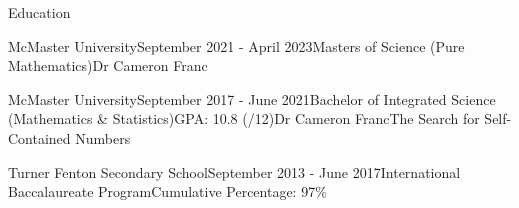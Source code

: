 \begin{rSection}{Education}

\begin{edSubsectionFull}{McMaster University}{September 2021 - April 2023}{Masters of Science (Pure Mathematics)}{}{Dr Cameron Franc}{}
\end{edSubsectionFull}

\begin{edSubsectionFull}{McMaster University}{September 2017 - June 2021}{Bachelor of Integrated Science (Mathematics \& Statistics)}{GPA: 10.8 (/12)}{Dr Cameron Franc}{The Search for Self-Contained Numbers}
\end{edSubsectionFull}


\begin{edSubsectionMin}{Turner Fenton Secondary School}{September 2013 - June 2017}{International Baccalaureate Program}{Cumulative Percentage: 97\%}
\end{edSubsectionMin}

\end{rSection}